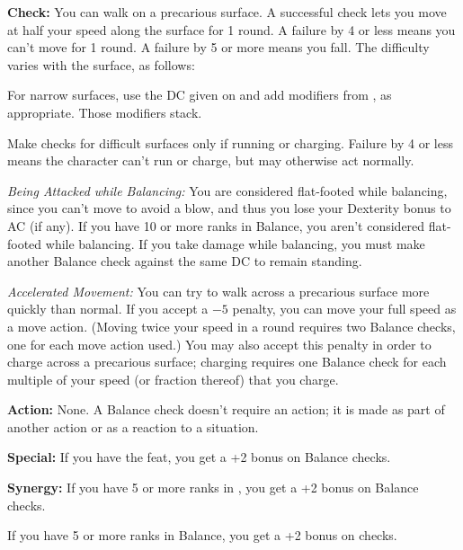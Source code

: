 \textbf{Check:} You can walk on a precarious surface. A successful check lets you move at half your speed along the surface for 1 round. A failure by 4 or less means you can't move for 1 round. A failure by 5 or more means you fall. The difficulty varies with the surface, as follows:



For narrow surfaces, use the DC given on  and add modifiers from , as appropriate. Those modifiers stack.

Make checks for difficult surfaces only if running or charging. Failure by 4 or less means the character can't run or charge, but may otherwise act normally.

\textit{Being Attacked while Balancing:} You are considered flat-footed while balancing, since you can't move to avoid a blow, and thus you lose your Dexterity bonus to AC (if any). If you have 10 or more ranks in Balance, you aren't considered flat-footed while balancing. If you take damage while balancing, you must make another Balance check against the same DC to remain standing.

\textit{Accelerated Movement:} You can try to walk across a precarious surface more quickly than normal. If you accept a $-5$ penalty, you can move your full speed as a move action. (Moving twice your speed in a round requires two Balance checks, one for each move action used.) You may also accept this penalty in order to charge across a precarious surface; charging requires one Balance check for each multiple of your speed (or fraction thereof) that you charge.

\textbf{Action:} None. A Balance check doesn't require an action; it is made as part of another action or as a reaction to a situation.

\textbf{Special:} If you have the  feat, you get a +2 bonus on Balance checks.

\textbf{Synergy:} If you have 5 or more ranks in , you get a +2 bonus on Balance checks.

If you have 5 or more ranks in Balance, you get a +2 bonus on  checks.